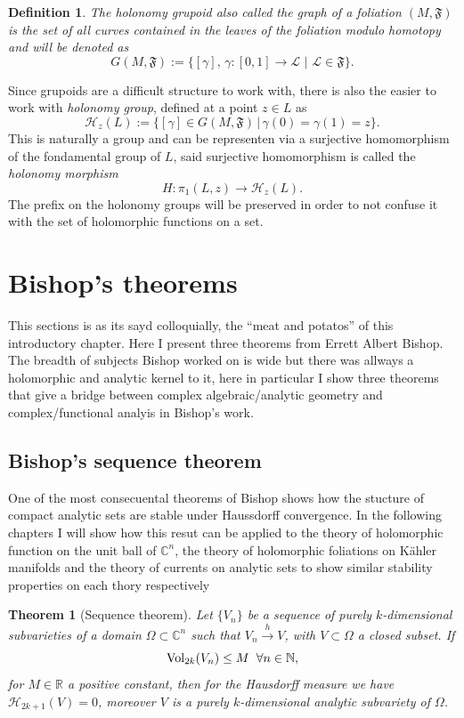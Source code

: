 \documentclass[12pt,twoside,a4paper]{report}
\newtheorem{definition}{Definition}[section]
\newtheorem{theorem}{Theorem}[section]
\newcommand{\nat}{\ensuremath{ \mathbb N }}
\newcommand{\re}{\ensuremath{\mathbb R }}
\newcommand{\con}{\ensuremath{\mathbb{C}^n}}
\newcommand{\om}{\ensuremath{\Omega}}
\begin{document}
  \begin{definition}
  The \emph{holonomy grupoid} also called the \emph{graph} of a foliation $(M,\mathfrak{F})$ is the set of all curves contained in the leaves of the foliation \textit{modulo homotopy} and will be denoted as
  \[
  G(M,\mathfrak{F}):=\{[\gamma],\,\gamma:[0,1]\rightarrow\mathcal{L}\,\,\vert\,\,\mathcal{L}\in\mathfrak{F}\}.
  \]
  \end{definition}
  Since grupoids are a difficult structure to work with, there is also the easier to work with \emph{holonomy group}, defined at a point $z\in L$ as
  \[
  \mathcal{H}_z(L):=\{[\gamma]\in G(M,\mathfrak{F})\,|\,\gamma(0)=\gamma(1)=z\}.
  \]
  This is naturally a group and can be representen via a surjective homomorphism of the fondamental group of $L$, said surjective homomorphism is called the \emph{holonomy morphism}
  \[
  H:\pi_{1}(L,z)\rightarrow\mathcal{H}_z(L).
  \]
  The prefix on the holonomy groups will be preserved in order to not confuse it with the set of holomorphic functions on a set.


  \section{Bishop's theorems}
  \noindent This sections is as its sayd colloquially, the ``meat and potatos'' of this introductory chapter. Here I present three theorems from Errett Albert Bishop. The breadth of subjects Bishop worked on is wide but there was allways a holomorphic and analytic kernel to it, here in particular I show three theorems that give a bridge between complex algebraic/analytic geometry and complex/functional analyis in Bishop's work.

  \subsection{Bishop's sequence theorem}
  \noindent One of the most consecuental theorems of Bishop shows how the stucture of compact analytic sets are stable under Haussdorff convergence. In the following chapters I will show how this resut can be applied to the theory of holomorphic function on the unit ball of $\con$, the theory of holomorphic foliations on Kähler manifolds and the theory of currents on analytic sets to show similar stability properties on each thory respectively

  \begin{theorem}[Sequence theorem] \label{bishop sequence}
    Let $\lbrace V_n\rbrace$ be a sequence of purely $k$-dimensional subvarieties of a domain $\om\subset\con$ such that $V_n\overset{h}\rightarrow V$, with $V\subset\om$ a closed subset. If
    \[
      \mathrm{Vol}_{2k}(V_n)\leq M \hspace*{0.2cm}\forall n\in\nat,
    \]
    for $M\in\re$ a positive constant, then for the Hausdorff measure we have $\mathcal{H}_{2k+1}(V)=0$, moreover $V$ is a purely $k$-dimensional analytic subvariety of $\om$.
  \end{theorem}
\end{document}
